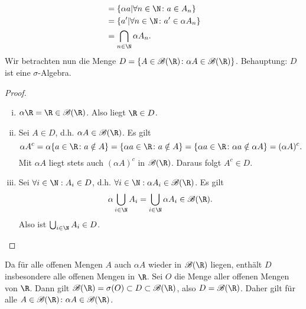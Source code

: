 \documentclass{article}
\begin{document}
\begin{enumerate}[(a)]
\begin{align*}
            &= \{\alpha a | \forall n\in \N \colon a \in A_n\}\\
            &= \{a' | \forall n \in \N\colon a' \in \alpha A_n\}\\
            &= \bigcap_{n\in \N} \alpha A_n.
        \end{align*}
        Wir betrachten nun die Menge $D = \{A \in \mathscr B (\R)\colon \alpha A \in \mathscr B(\R)\}$.
        Behauptung: $D$ ist eine $\sigma$-Algebra.
        \begin{proof}
            \begin{enumerate}[(i)]
                \item $\alpha \R = \R \in \mathscr B(\R)$. Also liegt $\R \in D$.
                \item Sei $A \in D$, d.h. $\alpha A \in \mathscr B(\R)$. Es gilt 
                \[
                    \alpha A^c = \alpha \{a \in \R\colon a \notin A\} = \{\alpha a \in \R\colon a \notin A\} = \{\alpha a \in \R \colon \alpha a \notin \alpha A\} = (\alpha A)^c.
                \]
                Mit $\alpha A$ liegt stets auch $(\alpha A)^c$ in $\mathscr B(\R)$. Daraus folgt $A^c \in D$. 
                \item Sei $\forall i\in \N: A_i \in D$, d.h. $\forall i \in \N: \alpha A_i \in \mathscr B(\R)$. Es gilt
                \[
                    \alpha \bigcup_{i\in \N} A_i = \bigcup_{i\in \N} \alpha A_i \in \mathscr B(\R).
                \]
                Also ist $\bigcup_{i\in \N} A_i \in D$.
            \end{enumerate}
        \end{proof}
        Da für alle offenen Mengen $A$ auch $\alpha A$ wieder in $\mathscr B(\R)$ liegen, enthält $D$ insbesondere alle offenen Mengen in $\R$. Sei $O$ die Menge aller offenen Mengen von $\R$. Dann gilt $\mathscr B (\R) = \sigma(O) \subset D\subset \mathscr B (\R)$, also $D = \mathscr B(\R)$. Daher gilt für alle $A \in \mathscr B(\R)\colon \alpha A \in \mathscr B(\R)$.
        

\end{enumerate}
\end{document}
